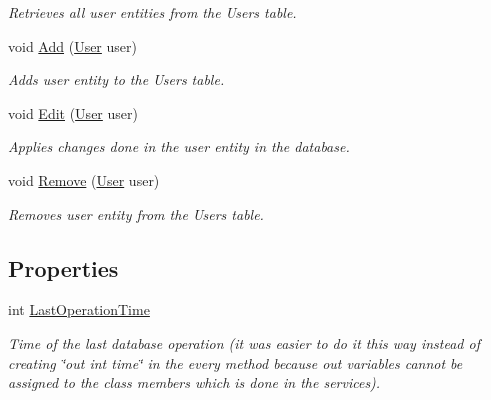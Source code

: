 \begin{DoxyCompactItemize}
\begin{DoxyCompactList}\small\item\em Retrieves all user entities from the Users table. \end{DoxyCompactList}\item 
void \mbox{\hyperlink{class_gielda_l2_1_1_i_n_f_r_a_s_t_r_u_c_t_u_r_e_1_1_repositories_1_1_user_repository_a686490e4e59fb25b843d11bab137ec56}{Add}} (\mbox{\hyperlink{class_gielda_l2_1_1_d_b_1_1_entities_1_1_user}{User}} user)
\begin{DoxyCompactList}\small\item\em Adds user entity to the Users table. \end{DoxyCompactList}\item 
void \mbox{\hyperlink{class_gielda_l2_1_1_i_n_f_r_a_s_t_r_u_c_t_u_r_e_1_1_repositories_1_1_user_repository_a2e07a0a1dd9a6731ed8706b82c66fb49}{Edit}} (\mbox{\hyperlink{class_gielda_l2_1_1_d_b_1_1_entities_1_1_user}{User}} user)
\begin{DoxyCompactList}\small\item\em Applies changes done in the user entity in the database. \end{DoxyCompactList}\item 
void \mbox{\hyperlink{class_gielda_l2_1_1_i_n_f_r_a_s_t_r_u_c_t_u_r_e_1_1_repositories_1_1_user_repository_a8715ce2a146a846905609162c41a6483}{Remove}} (\mbox{\hyperlink{class_gielda_l2_1_1_d_b_1_1_entities_1_1_user}{User}} user)
\begin{DoxyCompactList}\small\item\em Removes user entity from the Users table. \end{DoxyCompactList}\end{DoxyCompactItemize}
\subsection*{Properties}
\begin{DoxyCompactItemize}
\item 
int \mbox{\hyperlink{class_gielda_l2_1_1_i_n_f_r_a_s_t_r_u_c_t_u_r_e_1_1_repositories_1_1_user_repository_aec266d4cd489b911934e5317390c3cc4}{Last\+Operation\+Time}}
\begin{DoxyCompactList}\small\item\em Time of the last database operation (it was easier to do it this way instead of creating \char`\"{}out int time\char`\"{} in the every method because out variables cannot be assigned to the class members which is done in the services). \end{DoxyCompactList}\end{DoxyCompactItemize}


